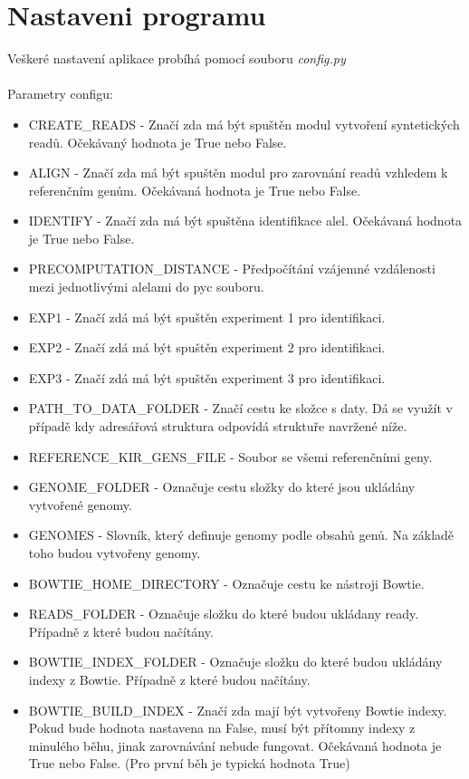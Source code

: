 \documentclass[czech,DP]{thesiskiv}
\numberwithin{equation}{section}
\begin{document}
\section{Nastaveni programu}
Veškeré nastavení aplikace probíhá pomocí souboru \textit{config.py}
\\
\\
\noindent
Parametry configu:
\begin{itemize}
	\item CREATE\_READS - Značí zda má být spuštěn modul vytvoření syntetických readů. Očekávaný hodnota je True nebo False.
	\item ALIGN - Značí zda má být spuštěn modul pro zarovnání readů vzhledem k referenčním genům. Očekávaná hodnota je True nebo False.
	\item IDENTIFY - Značí zda má být spuštěna identifikace alel. Očekávaná hodnota je True nebo False.
	\item PRECOMPUTATION\_DISTANCE - Předpočítání vzájemné vzdálenosti mezi jednotlivými alelami do pyc souboru. 
	\item EXP1 - Značí zdá má být spuštěn experiment 1 pro identifikaci.
	\item EXP2 - Značí zdá má být spuštěn experiment 2 pro identifikaci.
	\item EXP3 - Značí zdá má být spuštěn experiment 3 pro identifikaci.
	\item PATH\_TO\_DATA\_FOLDER - Značí cestu ke složce s daty. Dá se využít v případě kdy adresářová struktura odpovídá struktuře navržené níže.
	\item REFERENCE\_KIR\_GENS\_FILE - Soubor se všemi referenčními geny. 
	\item GENOME\_FOLDER - Označuje cestu složky do které jsou ukládány vytvořené genomy. 
	\item GENOMES - Slovník, který definuje genomy podle obsahů genů. Na základě toho budou vytvořeny genomy.
	\item BOWTIE\_HOME\_DIRECTORY - Označuje cestu ke nástroji Bowtie.
	\item READS\_FOLDER - Označuje složku do které budou ukládany ready. Případně z které budou načítány.
	\item BOWTIE\_INDEX\_FOLDER - Označuje složku do které budou ukládány indexy z Bowtie. Případně z které budou načítány. 
	\item BOWTIE\_BUILD\_INDEX - Značí zda mají být vytvořeny Bowtie indexy. Pokud bude hodnota nastavena na False, musí být přítomny indexy z minulého běhu, jinak zarovnávání nebude fungovat. Očekávaná hodnota je True nebo False. (Pro první běh je typická hodnota True)

\end{itemize}
\end{document}
